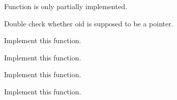 
\begin{DoxyRefList}
\item[Member \mbox{\hyperlink{classCMpeg_a30ae951a3e8191abfeb0b0ab255d4f79}{CMpeg\+::Execute}} (OID $\ast$oid)]\label{todo__todo000008}%
%
Function is only partially implemented. 

Double check whether oid is supposed to be a pointer.  
\item[Member \mbox{\hyperlink{classCMpeg_a2e5213e17d42e3b170cb761c4d0b0f0b}{CMpeg\+::Finish}} ()]\label{todo__todo000011}%
%
Implement this function.  
\item[Member \mbox{\hyperlink{classCMpeg_a9b83f6ada357c46a81102fc2943af749}{CMpeg\+::Start}} ()]\label{todo__todo000009}%
%
Implement this function.  
\item[Member \mbox{\hyperlink{classCMpeg_a5b20d64ead0378e8c2fd6be15d748523}{CMpeg\+::Update}} ()]\label{todo__todo000010}%
%
Implement this function.  
\item[Member \mbox{\hyperlink{gs_8h_a7d3a7ac7c0521091d5d3e3a855d3bc3a}{FGame\+Completion}} ()]\label{todo__todo000005}%
%
Implement this function. 
\end{DoxyRefList}